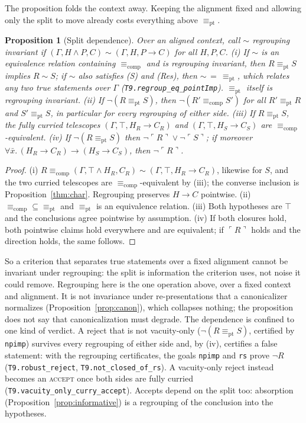 \documentclass[10pt]{article}
\newtheorem{proposition}[theorem]{Proposition}
\theoremstyle{definition}
\newcommand{\Cl}[1]{\ulcorner #1 \urcorner}
\newcommand{\Ecomp}{\mathrel{\equiv_{\mathrm{comp}}}}
\newcommand{\Epi}{\mathrel{\equiv_{\mathrm{pt}}}}
\newcommand{\V}[1]{\textsc{#1}}
\begin{document}
The proposition folds the context away. Keeping the alignment fixed and allowing only the
split to move already costs everything above $\Epi$.

\begin{proposition}[Split dependence]\label{prop:split}
Over an aligned context, call $\sim$ \emph{regrouping invariant} if
$(\Gamma,H\wedge P,C)\sim(\Gamma,H,P\to C)$ for all $H,P,C$. (i) If $\sim$ is an equivalence
relation containing $\Ecomp$ and is regrouping invariant, then $R\Epi S$ implies $R\sim S$; if
$\sim$ also satisfies (S) and (Res), then $\sim\,=\,\Epi$, which relates any two true statements
over $\Gamma$ (\texttt{T9.regroup\_eq\_pointImp}). $\Epi$ itself is regrouping invariant. (ii) If $\neg(R\Epi S)$, then
$\neg(R'\Ecomp S')$ for all $R'\Epi R$ and $S'\Epi S$, in particular for every regrouping of
either side. (iii) If $R\Epi S$, the fully curried telescopes $(\Gamma,\top,H_R\to C_R)$ and
$(\Gamma,\top,H_S\to C_S)$ are $\Ecomp$-equivalent. (iv) If $\neg(R\Epi S)$ then
$\neg\Cl R\vee\neg\Cl S$; if moreover $\forall\bar x.\,(H_R\to C_R)\to(H_S\to C_S)$, then $\neg\Cl R$.
\end{proposition}
\begin{proof}
(i) $R\Ecomp(\Gamma,\top\wedge H_R,C_R)\sim(\Gamma,\top,H_R\to C_R)$, likewise for $S$, and the two
curried telescopes are $\Ecomp$-equivalent by (iii); the converse inclusion is
Proposition~\ref{thm:char}. Regrouping preserves $H\to C$ pointwise. (ii) $\Ecomp\subseteq\Epi$ and
$\Epi$ is an equivalence relation. (iii) Both hypotheses are $\top$ and the conclusions agree
pointwise by assumption. (iv) If both closures hold, both pointwise claims hold everywhere and
are equivalent; if $\Cl R$ holds and the direction holds, the same follows.
\end{proof}

So a criterion that separates true statements over a fixed alignment cannot be invariant
under regrouping: the split is information the criterion uses, not noise it could remove.
Regrouping here is the one operation above, over a fixed context and alignment. It is not
invariance under re-presentations that a canonicalizer normalizes (Proposition~\ref{prop:canon}),
which collapses nothing; the proposition does not say that canonicalization must degrade. The
dependence is confined to one kind of verdict. A reject that is not vacuity-only
($\neg(R\Epi S)$, certified by \texttt{npimp}) survives every regrouping of either side and, by
(iv), certifies a false statement: with the regrouping certificates, the goals \texttt{npimp} and
\texttt{rs} prove $\neg R$ (\texttt{T9.robust\_reject}, \texttt{T9.not\_closed\_of\_rs}). A
vacuity-only reject instead becomes an \V{accept} once both sides are fully curried
(\texttt{T9.vacuity\_only\_curry\_accept}). Accepts depend on the split too: absorption
(Proposition~\ref{prop:informative}) is a regrouping of the conclusion into the hypotheses.
\end{document}
